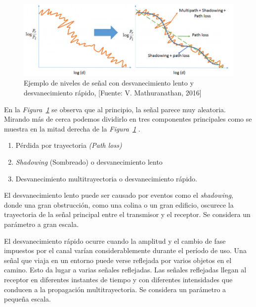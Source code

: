 \begin{figure}[th]
\centering
\includegraphics[scale=.8]{Figures/Ejemplo de niveles de señal con desvanecimiento lento y desvanecimiento rápido}
\decoRule
\caption[Ejemplo de niveles de señal con desvanecimiento lento y desvanecimiento rápido]{Ejemplo de niveles de señal con desvanecimiento lento y desvanecimiento rápido, [Fuente: V. Mathuranathan, 2016]}
\label{fig:Desvanecimientos}
\end{figure}

En la \textit{Figura~\ref{fig:Desvanecimientos}} se observa que al principio, la señal parece muy aleatoria. Mirando más de cerca podemos dividirlo en tres componentes principales como se muestra en la mitad derecha de la \textit{Figura~\ref{fig:Desvanecimientos}} \parencite{Mathuranathan2016}.\newline

\begin{enumerate}
    \item  Pérdida por trayectoria \textit{(Path loss)}
    \item  \textit{Shadowing} (Sombreado) o desvanecimiento lento
    \item  Desvanecimiento multitrayectoria o desvanecimiento rápido.
\end{enumerate}

El desvanecimiento lento puede ser causado por eventos como el \textit{shadowing}, donde una gran obstrucción, como una colina o un gran edificio, oscurece la trayectoria de la señal principal entre el transmisor y el receptor. Se considera un parámetro a gran escala.\newline

El desvanecimiento rápido ocurre cuando la amplitud y el cambio de fase impuestos por el canal varían considerablemente durante el período de uso. Una señal que viaja en un entorno puede verse reflejada por varios objetos en el camino. Esto da lugar a varias señales reflejadas. Las señales reflejadas llegan al receptor en diferentes instantes de tiempo y con diferentes intensidades que conducen a la propagación multitrayectoria. Se considera un parámetro a pequeña escala.\newline

